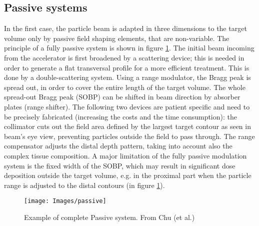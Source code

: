 \documentclass[12pt, a4paper, twoside]{book}
\begin{document}
\subsection{Passive systems}
In the first case, the particle beam is adapted in three dimensions to the target volume only by passive field shaping elements, that are non-variable.
The principle of a fully passive system is shown in figure \ref{fig:passive}. The initial beam incoming from the accelerator is first broadened by a scattering device; this is needed in order to generate a flat transversal profile for a more efficient treatment. This is done by a double-scattering system.
Using a range modulator, the Bragg peak is spread out, in order to cover the entire length of the target volume. The whole spread-out Bragg peak (SOBP) can be shifted in beam direction by absorber plates (range shifter). 
The following two devices are patient specific and need to be precisely fabricated (increasing the costs and the time consumption): the collimator cuts out the field area defined by the largest target contour as seen in beam’s eye view, preventing particles outside the field to pass through. 
The range compensator adjusts the distal depth pattern, taking into account also the complex tissue composition. A major limitation of the fully passive modulation system is the fixed width of the SOBP, which may result in significant dose deposition outside the target volume, e.g. in the proximal part when the particle range is adjusted to the distal contours (in figure \ref{fig:passive}).
\begin{figure}[t]
{\texttt{[image: Images/passive]}}
\caption{Example of complete Passive system. From Chu (et al.) \cite{chu:pass}}
\label{fig:passive}
\end{figure}
\end{document}
